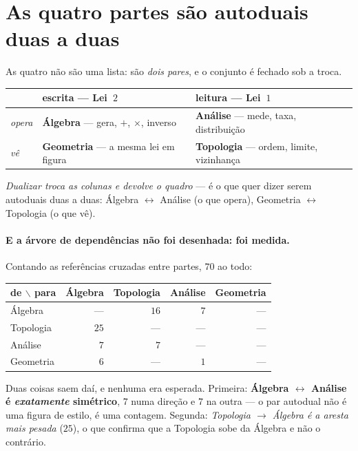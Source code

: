 \documentclass[livro.tex]{subfiles}
\begin{document}
\section{As quatro partes são autoduais duas a duas}\label{sec:geoarvore}

As quatro não são uma lista: são \emph{dois pares}, e o conjunto é fechado sob a troca.

\begin{center}\small
\begin{tabular}{@{}lll@{}}
\toprule
 & \textbf{escrita} --- Lei~$2$ & \textbf{leitura} --- Lei~$1$ \\
\midrule
\emph{opera} & \textbf{Álgebra} --- gera, $+$, $\times$, inverso & \textbf{Análise} --- mede, taxa, distribuição \\
\emph{vê}    & \textbf{Geometria} --- a mesma lei em figura      & \textbf{Topologia} --- ordem, limite, vizinhança \\
\bottomrule
\end{tabular}
\end{center}

\noindent \emph{Dualizar troca as colunas e devolve o quadro} --- é o que quer dizer serem
autoduais duas a duas: Álgebra $\leftrightarrow$ Análise (o que opera), Geometria
$\leftrightarrow$ Topologia (o que vê).

\paragraph{E a árvore de dependências não foi desenhada: foi medida.} Contando as referências
cruzadas entre partes, $70$ ao todo:

\begin{center}\small
\begin{tabular}{@{}lrrrr@{}}
\toprule
de $\backslash$ para & Álgebra & Topologia & Análise & Geometria \\
\midrule
Álgebra   & ---  & $16$ & $7$ & --- \\
Topologia & $25$ & ---  & --- & --- \\
Análise   & $7$  & $7$  & --- & --- \\
Geometria & $6$  & ---  & $1$ & --- \\
\bottomrule
\end{tabular}
\end{center}

\noindent Duas coisas saem daí, e nenhuma era esperada. Primeira: \textbf{Álgebra
$\leftrightarrow$ Análise é \emph{exatamente} simétrico}, $7$ numa direção e $7$ na outra --- o par
autodual não é uma figura de estilo, é uma contagem. Segunda: \emph{Topologia $\to$ Álgebra é a
aresta mais pesada} ($25$), o que confirma que a Topologia sobe da Álgebra e não o contrário.
\end{document}
